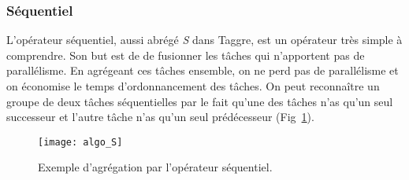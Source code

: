 \subsubsection{Séquentiel}
L'opérateur séquentiel, aussi abrégé {\em S} dans Taggre, est un opérateur très simple à comprendre.
%
Son but est de de fusionner les tâches qui n'apportent pas de parallélisme.
%
En agrégeant ces tâches ensemble, on ne perd pas de parallélisme et on économise le temps d'ordonnancement des tâches.
%
On peut reconnaître un groupe de deux tâches séquentielles par le fait qu'une des tâches n'as qu'un seul successeur et l'autre tâche n'as qu'un seul prédécesseur (Fig~\ref{fig:algo_S}).
%
\begin{figure}[t!]
  \centering
  \texttt{[image: algo\_S]}
  \caption{Exemple d'agrégation par l'opérateur séquentiel.}
  \label{fig:algo_S}
\end{figure}
